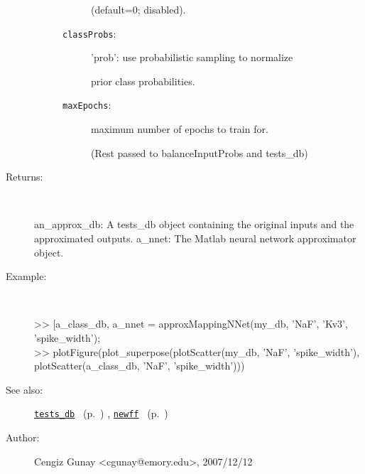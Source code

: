\begin{description}
\begin{description}
\begin{description}
(default=0; disabled).
\item[\texttt{classProbs}:]
 'prob': use probabilistic sampling to normalize

prior class probabilities.
\item[\texttt{maxEpochs}:]
 maximum number of epochs to train for.

(Rest passed to balanceInputProbs and tests\_db)
\end{description}%
\end{description}%
%
\item[Returns:
]~

	an\_approx\_db: A tests\_db object containing the original inputs and
			the approximated outputs.
	a\_nnet: The Matlab neural network approximator object.
%
\item[Example:]~
\begin{lyxcode} >> [a\_class\_db, a\_nnet = approxMappingNNet(my\_db, {'NaF', 'Kv3'}, {'spike\_width'});
\\%
 >> plotFigure(plot\_superpose({plotScatter(my\_db, 'NaF', 'spike\_width'),
\\%
                                plotScatter(a\_class\_db, 'NaF', 'spike\_width')}))
\\%
\end{lyxcode}
%
\item[See also:]%
\hyperlink{ref_tests_db}{\texttt{tests\_db}}%
\ (p.~\pageref{ref_tests_db})%
%
, \hyperlink{ref_newff}{\texttt{newff}}%
\ (p.~\pageref{ref_newff})%
%
%
\item[Author:]%
Cengiz Gunay <cgunay@emory.edu>, 2007/12/12
%
\end{description}
\methodline%
